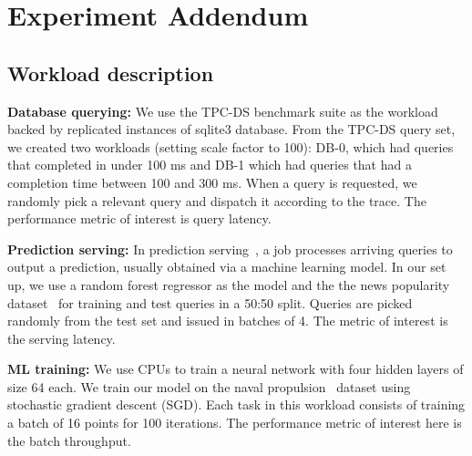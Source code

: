 \section{Experiment Addendum}
\subsection{Workload description}

\textbf{Database querying:}
We use the TPC-DS \cite{tpc-ds} benchmark suite as the workload backed by replicated instances of sqlite3 database. 
From the TPC-DS query set, we created two workloads (setting scale factor to 100): DB-0, which had queries that completed in under 100 ms and DB-1 which had queries that had a completion time between 100 and 300 ms.
When a query is requested, we randomly pick a relevant query and dispatch it
according to the trace. The performance metric of interest is  query latency.


\textbf{Prediction serving:}
In prediction serving~\cite{crankshaw2017clipper}, a job processes arriving queries
to output a prediction, usually obtained via a machine learning model.
In our set up, we use a random forest regressor as the model and the the news popularity
dataset~\cite{fernandes2015proactive} for training and test queries in a 50:50 split.
Queries are picked randomly from the test set and issued in batches of 4.
The metric of interest is the serving latency.


\textbf{ML training:}
We use CPUs to train a neural network with four hidden layers of size 64 each.
We train our model on the naval propulsion~\cite{coraddu2016machine} dataset using
stochastic gradient descent (SGD).
Each task in this workload consists of training a batch of 16 points for 100 iterations. The performance metric of interest here is the batch throughput.


